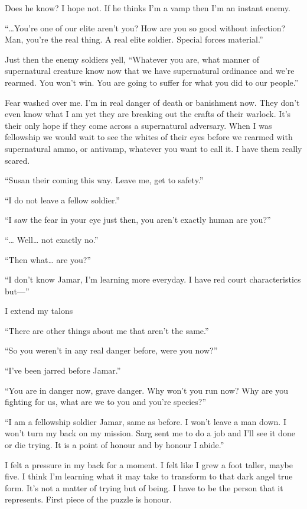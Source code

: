 Does he know? I hope not. If he thinks I'm a vamp then I'm an instant enemy.

``\dots{}You're one of our elite aren't you? How are you so good without infection? Man, you're the real thing. A real elite soldier. Special forces material.''

Just then the enemy soldiers yell, ``Whatever you are, what manner of supernatural creature know now that we have supernatural ordinance and we're rearmed. You won't win. You are going to suffer for what you did to our people.''

Fear washed over me. I'm in real danger of death or banishment now. They don't even know what I am yet they are breaking out the crafts of their warlock. It's their only hope if they come across a supernatural adversary. When I was fellowship we would wait to see the whites of their eyes before we rearmed with supernatural ammo, or antivamp, whatever you want to call it. I have them really scared.

``Susan their coming this way. Leave me, get to safety.''

``I do not leave a fellow soldier.''

``I saw the fear in your eye just then, you aren't exactly human are you?''

``\dots{} Well\dots{} not exactly no.''

``Then what\dots{} are you?''

``I don't know Jamar, I'm learning more everyday. I have red court characteristics but---''

I extend my talons

``There are other things about me that aren't the same.''

``So you weren't in any real danger before, were you now?''

``I've been jarred before Jamar.''

``You are in danger now, grave danger. Why won't you run now? Why are you fighting for us, what are we to you and you're species?''

``I am a fellowship soldier Jamar, same as before. I won't leave a man down. I won't turn my back on my mission. Sarg sent me to do a job and I'll see it done or die trying. It is a point of honour and by honour I abide.''

I felt a pressure in my back for a moment. I felt like I grew a foot taller, maybe five. I think I'm learning what it may take to transform to that dark angel true form. It's not a matter of trying but of being. I have to be the person that it represents. First piece of the puzzle is honour.

